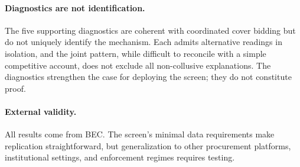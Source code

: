 \paragraph{Diagnostics are not identification.}
The five supporting diagnostics are coherent with coordinated cover
bidding but do not uniquely identify the mechanism. Each admits
alternative readings in isolation, and the joint pattern, while
difficult to reconcile with a simple competitive account, does not
exclude all non-collusive explanations. The diagnostics strengthen
the case for deploying the screen; they do not constitute proof.

\paragraph{External validity.}
All results come from BEC. The screen's minimal data requirements
make replication straightforward, but generalization to other
procurement platforms, institutional settings, and enforcement
regimes requires testing.
